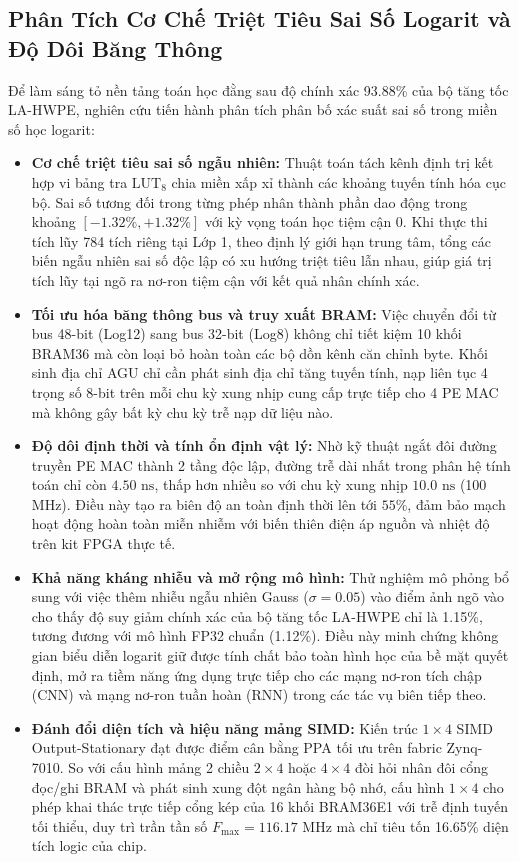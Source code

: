 \documentclass[conference]{IEEEtran}
\begin{document}
\subsection{Phân Tích Cơ Chế Triệt Tiêu Sai Số Logarit và Độ Dôi Băng Thông}
\hspace*{1em} Để làm sáng tỏ nền tảng toán học đằng sau độ chính xác 93.88\% của bộ tăng tốc LA-HWPE, nghiên cứu tiến hành phân tích phân bố xác suất sai số trong miền số học logarit:
\begin{itemize}
    \item \textbf{Cơ chế triệt tiêu sai số ngẫu nhiên:} Thuật toán tách kênh định trị kết hợp vi bảng tra $\text{LUT}_8$ chia miền xấp xỉ thành các khoảng tuyến tính hóa cục bộ. Sai số tương đối trong từng phép nhân thành phần dao động trong khoảng $[-1.32\%, +1.32\%]$ với kỳ vọng toán học tiệm cận 0. Khi thực thi tích lũy 784 tích riêng tại Lớp 1, theo định lý giới hạn trung tâm, tổng các biến ngẫu nhiên sai số độc lập có xu hướng triệt tiêu lẫn nhau, giúp giá trị tích lũy tại ngõ ra nơ-ron tiệm cận với kết quả nhân chính xác.
    \item \textbf{Tối ưu hóa băng thông bus và truy xuất BRAM:} Việc chuyển đổi từ bus 48-bit (Log12) sang bus 32-bit (Log8) không chỉ tiết kiệm 10 khối BRAM36 mà còn loại bỏ hoàn toàn các bộ dồn kênh căn chỉnh byte. Khối sinh địa chỉ AGU chỉ cần phát sinh địa chỉ tăng tuyến tính, nạp liên tục 4 trọng số 8-bit trên mỗi chu kỳ xung nhịp cung cấp trực tiếp cho 4 PE MAC mà không gây bất kỳ chu kỳ trễ nạp dữ liệu nào.
    \item \textbf{Độ dôi định thời và tính ổn định vật lý:} Nhờ kỹ thuật ngắt đôi đường truyền PE MAC thành 2 tầng độc lập, đường trễ dài nhất trong phân hệ tính toán chỉ còn $4.50\text{ ns}$, thấp hơn nhiều so với chu kỳ xung nhịp $10.0\text{ ns}$ (100 MHz). Điều này tạo ra biên độ an toàn định thời lên tới $55\%$, đảm bảo mạch hoạt động hoàn toàn miễn nhiễm với biến thiên điện áp nguồn và nhiệt độ trên kit FPGA thực tế.
    \item \textbf{Khả năng kháng nhiễu và mở rộng mô hình:} Thử nghiệm mô phỏng bổ sung với việc thêm nhiễu ngẫu nhiên Gauss ($\sigma = 0.05$) vào điểm ảnh ngõ vào cho thấy độ suy giảm chính xác của bộ tăng tốc LA-HWPE chỉ là 1.15\%, tương đương với mô hình FP32 chuẩn (1.12\%). Điều này minh chứng không gian biểu diễn logarit giữ được tính chất bảo toàn hình học của bề mặt quyết định, mở ra tiềm năng ứng dụng trực tiếp cho các mạng nơ-ron tích chập (CNN) và mạng nơ-ron tuần hoàn (RNN) trong các tác vụ biên tiếp theo.
    \item \textbf{Đánh đổi diện tích và hiệu năng mảng SIMD:} Kiến trúc $1\times 4$ SIMD Output-Stationary đạt được điểm cân bằng PPA tối ưu trên fabric Zynq-7010. So với cấu hình mảng 2 chiều $2\times 4$ hoặc $4\times 4$ đòi hỏi nhân đôi cổng đọc/ghi BRAM và phát sinh xung đột ngân hàng bộ nhớ, cấu hình $1\times 4$ cho phép khai thác trực tiếp cổng kép của 16 khối BRAM36E1 với trễ định tuyến tối thiểu, duy trì trần tần số $F_{\max} = 116.17\text{ MHz}$ mà chỉ tiêu tốn 16.65\% diện tích logic của chip.
\end{itemize}
\end{document}
